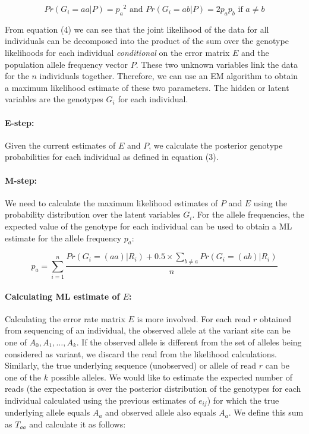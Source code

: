 \documentclass{article}
\begin{document}
\[ Pr(G_i = aa | P) = {p_a}^2 \mbox { and }  Pr(G_i = ab | P) = 2p_ap_b \mbox { if } a \neq b \] 


From equation (4) we can see that the joint likelihood of the data for all individuals can be decomposed into the product of the sum over the genotype likelihoods for each individual {\it conditional} on the error matrix $E$ and the population allele frequency vector $P$. These two unknown variables link the data for the $n$ individuals together. Therefore, we can use an EM algorithm to obtain a maximum likelihood estimate of these two parameters. The hidden or latent variables are the genotypes $G_i$ for each individual. 

\paragraph{E-step:} Given the current estimates of $E$ and $P$, we calculate the posterior genotype probabilities for each individual as defined in equation (3).

\paragraph{M-step:} We need to calculate the maximum likelihood estimates of $P$ and $E$ using the probability distribution over the latent variables $G_i$. For the allele frequencies, the expected value of the genotype for each individual can be used to obtain a ML estimate for the allele frequency $p_a$: 

\[ p_a = \sum_{i=1}^n \frac{   Pr(G_i = (aa) | R_i) + 0.5 \times \sum_{b \neq a} Pr(G_i = (ab)| R_i)}{n} \] 

\paragraph{Calculating ML estimate of $E$:} Calculating the error rate matrix $E$ is more involved. For each read $r$ obtained from sequencing of an individual, the observed allele at the variant site can be one of $A_0, A_1, \ldots, A_k$. If the observed allele is different from the set of alleles being considered as variant, we discard the read from the likelihood calculations. 
Similarly, the true underlying sequence (unobserved) or allele of read $r$ can be one of the $k$ possible alleles. 
We would like to estimate the expected number of reads (the expectation is over the posterior distribution of the genotypes for each individual calculated using the previous estimates of $e_{ij}$) for which the true underlying allele equals $A_a$ and 
observed allele also equals $A_a$. We define this sum as $T_{aa}$ and calculate it as follows: 
\end{document}
